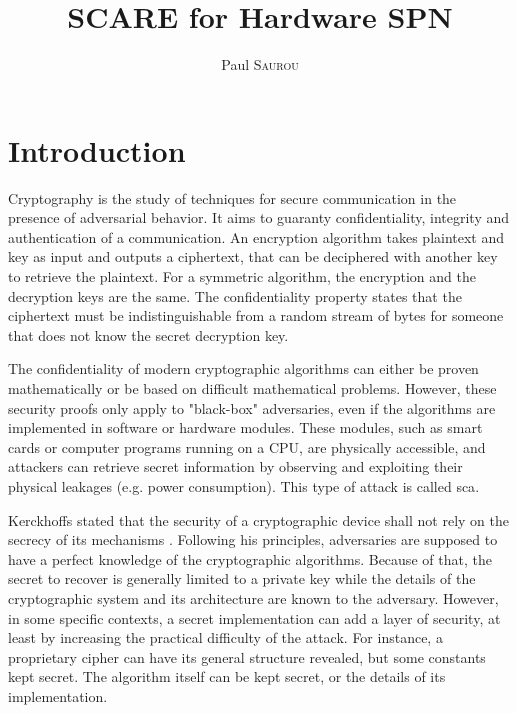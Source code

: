\documentclass[11pt]{sdm}
\title{SCARE for Hardware SPN}
\author{Paul \textsc{Saurou}}
\begin{document}
\maketitle


\section*{Introduction}

Cryptography is the study of techniques for secure communication in the presence of adversarial behavior.
It aims to guaranty confidentiality, integrity and authentication of a communication.
An encryption algorithm takes plaintext and key as input and outputs a ciphertext, that can be deciphered with another key to retrieve the plaintext.
For a symmetric algorithm, the encryption and the decryption keys are the same. 
The confidentiality property states that the ciphertext must be indistinguishable from a random stream of bytes for someone that does not know the secret decryption key.

The confidentiality of modern cryptographic algorithms can either be proven mathematically or be based on difficult mathematical problems.
However, these security proofs only apply to "black-box" adversaries, even if the algorithms are implemented in software or hardware modules.
These modules, such as smart cards or computer programs running on a CPU, are physically accessible, and attackers can retrieve secret information by observing and exploiting their physical leakages (e.g. power consumption).
This type of attack is called \acrfull{sca}.

Kerckhoffs stated that the security of a cryptographic device shall not rely on the secrecy of its mechanisms  \parencite{Kerckhoffs_1883}.
Following his principles, adversaries are supposed to have a perfect knowledge of the cryptographic algorithms.
Because of that, the secret to recover is generally limited to a private key while the details of the cryptographic system and its architecture are known to the adversary.
However, in some specific contexts, a secret implementation can add a layer of security, at least by increasing the practical difficulty of the attack.
For instance, a proprietary cipher can have its general structure revealed, but some constants kept secret.
The algorithm itself can be kept secret, or the details of its implementation.
\end{document}
